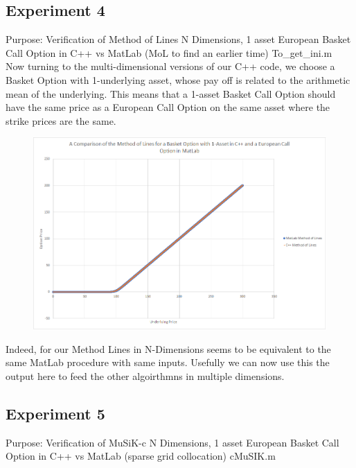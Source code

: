 \documentclass[a4paper]{amsart}
\begin{document}
\subsection{Experiment 4}\label{cppExp4}

Purpose: Verification of Method of Lines N Dimensions, 1 asset European Basket Call Option in C++ vs MatLab (MoL to find an earlier time) To\_get\_ini.m\\

Now turning to the multi-dimensional versions of our C++ code, we choose a Basket Option with 1-underlying asset, whose pay off is related to the arithmetic mean of the underlying. This means that a 1-asset Basket Call Option should have the same price as a European Call Option on the same asset where the strike prices are the same.

\begin{figure}[h]
\centering
\includegraphics[scale=0.3]{cppExp4-chart.png}
\caption {}
\label {fig:cppExp4}
\end{figure}

Indeed, for our Method Lines in N-Dimensions seems to be equivalent to the same MatLab procedure with same inputs. Usefully we can now use this the output here to feed the other algoirthmns in multiple dimensions.

\subsection{Experiment 5}\label{cppExp5}

Purpose: Verification of MuSiK-c N Dimensions, 1 asset European Basket Call Option in C++ vs MatLab (sparse grid collocation) cMuSIK.m\\
\end{document}
